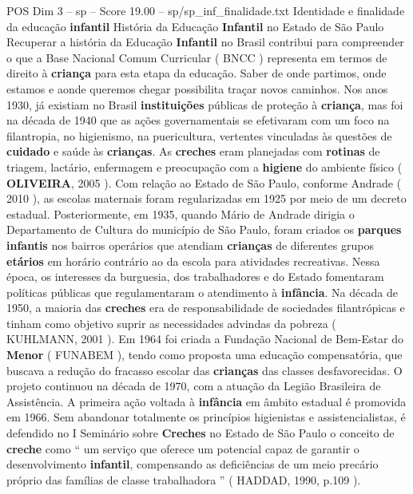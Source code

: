 \begin{textsample}{POS Dim 3 – sp – Score 19.00 – sp/sp\_inf\_finalidade.txt}  \label{ex:f3_pos_202}
Identidade e finalidade da educação \textbf{infantil} História da Educação \textbf{Infantil} no Estado de São Paulo Recuperar a história da Educação \textbf{Infantil} no Brasil contribui para compreender o que a Base Nacional Comum Curricular ( BNCC ) representa em termos de direito à \textbf{criança} para esta etapa da educação.
Saber de onde partimos, onde estamos e aonde queremos chegar possibilita traçar novos caminhos.
Nos anos 1930, já existiam no Brasil \textbf{instituições} públicas de proteção à \textbf{criança}, mas foi na década de 1940 que as ações governamentais se efetivaram com um foco na filantropia, no higienismo, na puericultura, vertentes vinculadas às questões de \textbf{cuidado} e saúde às \textbf{crianças}.
As \textbf{creches} eram planejadas com \textbf{rotinas} de triagem, lactário, enfermagem e preocupação com a \textbf{higiene} do ambiente físico ( \textbf{OLIVEIRA}, 2005 ).
Com relação ao Estado de São Paulo, conforme Andrade ( 2010 ), as escolas maternais foram regularizadas em 1925 por meio de um decreto estadual.
Posteriormente, em 1935, quando Mário de Andrade dirigia o Departamento de Cultura do município de São Paulo, foram criados os \textbf{parques} \textbf{infantis} nos bairros operários que atendiam \textbf{crianças} de diferentes grupos \textbf{etários} em horário contrário ao da escola para atividades recreativas.
Nessa época, os interesses da burguesia, dos trabalhadores e do Estado fomentaram políticas públicas que regulamentaram o atendimento à \textbf{infância}.
Na década de 1950, a maioria das \textbf{creches} era de responsabilidade de sociedades filantrópicas e tinham como objetivo suprir as necessidades advindas da pobreza ( KUHLMANN, 2001 ).
Em 1964 foi criada a Fundação Nacional de Bem-Estar do \textbf{Menor} ( FUNABEM ), tendo como proposta uma educação compensatória, que buscava a redução do fracasso escolar das \textbf{crianças} das classes desfavorecidas.
O projeto continuou na década de 1970, com a atuação da Legião Brasileira de Assistência.
A primeira ação voltada à \textbf{infância} em âmbito estadual é promovida em 1966.
Sem abandonar totalmente os princípios higienistas e assistencialistas, é defendido no I Seminário sobre \textbf{Creches} no Estado de São Paulo o conceito de \textbf{creche} como “ um serviço que oferece um potencial capaz de garantir o desenvolvimento \textbf{infantil}, compensando as deficiências de um meio precário próprio das famílias de classe trabalhadora ” ( HADDAD, 1990, p.109 ).

\end{textsample}

